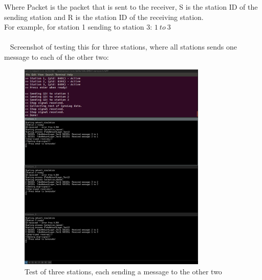 Where Packet is the packet that is sent to the receiver, S is the station ID of the sending station and R is the station ID of the receiving station.\\
For example, for station 1 sending to station 3: $1\ to\ 3$\\
\\~
Screenshot of testing this for three stations, where all stations sends one message to each of the other two:
\begin{figure}[H]
\centering
\includegraphics[width=0.8\textwidth]{Test1.png}
\caption{Test of three stations, each sending a message to the other two}
\label{fig:threestationtest}
\end{figure}
